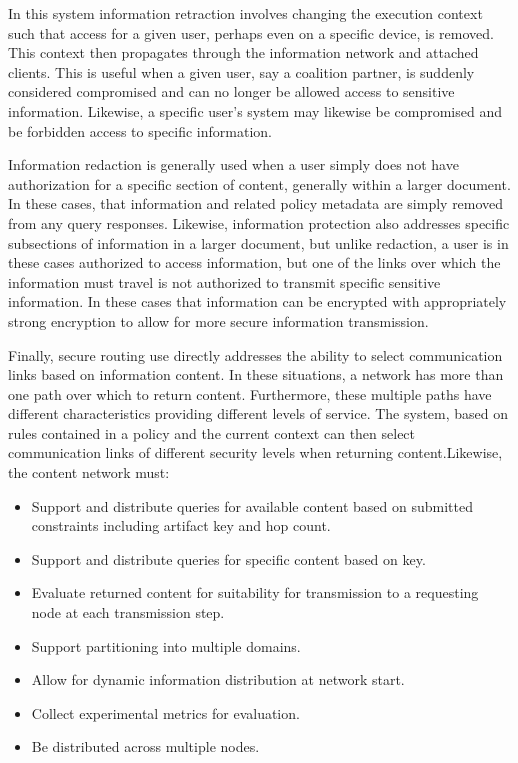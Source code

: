 In this system information retraction involves changing the execution context such that access for a given user, perhaps even on a specific device, is removed.  This context then propagates through the information network and attached clients.  This is useful when a given user, say a coalition partner, is suddenly considered compromised and can no longer be allowed access to sensitive information.  Likewise, a specific user's system may likewise be compromised and be forbidden access to specific information.

Information redaction is generally used when a user simply does not have authorization for a specific section of content, generally within a larger document. In these cases, that information and related policy metadata are simply removed from any query responses.  Likewise, information protection also addresses specific subsections of information in a larger document, but unlike redaction, a user is in these cases authorized to access information, but one of the links over which the information must travel is not authorized to transmit specific sensitive information.  In these cases that information can be encrypted with appropriately strong encryption to allow for more secure information transmission.

Finally, secure routing use directly addresses the ability to select communication links based on information content.  In these situations, a network has more than one path over which to return content.  Furthermore, these multiple paths have different characteristics providing different levels of service.  The system, based on rules contained in a policy and the current context can then select communication links of different security levels when returning content.Likewise, the content network must:

\begin{itemize}
\item Support and distribute queries for available content based on submitted constraints including artifact key and hop count.
\item Support and distribute queries for specific content based on key.
\item Evaluate returned content for suitability for transmission to a requesting node at each transmission step.
\item Support partitioning into multiple domains.
\item Allow for dynamic information distribution at network start.
\item Collect experimental metrics for evaluation.
\item Be distributed across multiple nodes.
\end{itemize}

